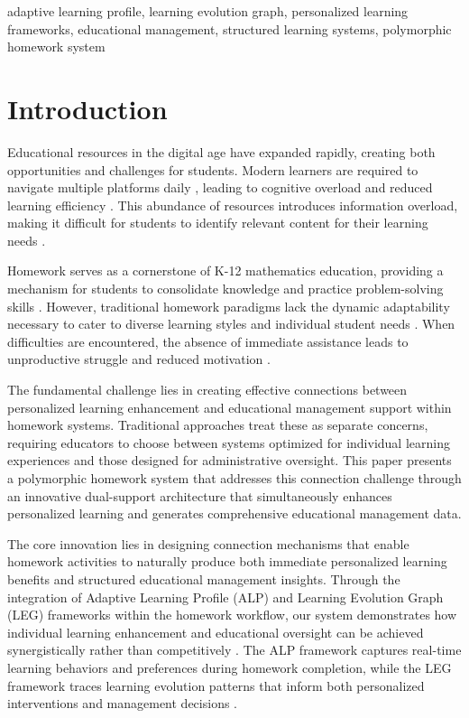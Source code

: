 \documentclass[conference]{IEEEtran}
\begin{document}
\begin{IEEEkeywords}
\begin{IEEEkeywords}
adaptive learning profile, learning evolution graph, personalized learning frameworks, educational management, structured learning systems, polymorphic homework system
\end{IEEEkeywords}

\section{Introduction}

Educational resources in the digital age have expanded rapidly, creating both opportunities and challenges for students. Modern learners are required to navigate multiple platforms daily \cite{author2020educational}, leading to cognitive overload and reduced learning efficiency \cite{sweller2024cognitive}. This abundance of resources introduces information overload, making it difficult for students to identify relevant content for their learning needs \cite{paas2025measurement}.

Homework serves as a cornerstone of K-12 mathematics education, providing a mechanism for students to consolidate knowledge and practice problem-solving skills \cite{cooper2024homework}. However, traditional homework paradigms lack the dynamic adaptability necessary to cater to diverse learning styles and individual student needs \cite{deci2025intrinsic}. When difficulties are encountered, the absence of immediate assistance leads to unproductive struggle and reduced motivation \cite{ryan2024self}.

The fundamental challenge lies in creating effective connections between personalized learning enhancement and educational management support within homework systems. Traditional approaches treat these as separate concerns, requiring educators to choose between systems optimized for individual learning experiences and those designed for administrative oversight. This paper presents a polymorphic homework system that addresses this connection challenge through an innovative dual-support architecture that simultaneously enhances personalized learning and generates comprehensive educational management data.

The core innovation lies in designing connection mechanisms that enable homework activities to naturally produce both immediate personalized learning benefits and structured educational management insights. Through the integration of Adaptive Learning Profile (ALP) and Learning Evolution Graph (LEG) frameworks within the homework workflow, our system demonstrates how individual learning enhancement and educational oversight can be achieved synergistically rather than competitively \cite{brusilovsky2024adaptive}. The ALP framework captures real-time learning behaviors and preferences during homework completion, while the LEG framework traces learning evolution patterns that inform both personalized interventions and management decisions \cite{ricci2025introduction}.


\end{IEEEkeywords}
\end{document}
